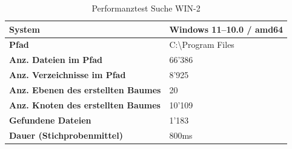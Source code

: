\documentclass[a4paper,12pt]{report}
\begin{document}
    \begin{table}[h!]
        \centering
        \setlength{\leftmargini}{0.8cm}
        \begin{tabular}{|p{7cm}|p{5cm}|}
            \hline
            \textbf{System}                                     & Windows 11--10.0 / amd64       \\ \hline
            \textbf{Pfad}                                       & C:\textbackslash Program Files \\ \hline
            \textbf{Anz. Dateien im Pfad}                       & 66'386                         \\ \hline
            \textbf{Anz. Verzeichnisse im Pfad}                 & 8'925                          \\ \hline
            \textbf{Anz. Ebenen \newline des erstellten Baumes} & 20                             \\ \hline
            \textbf{Anz. Knoten \newline des erstellten Baumes} & 10'109                         \\ \hline
            \textbf{Gefundene Dateien}                          & 1'183                          \\ \hline
            \textbf{Dauer (Stichprobenmittel)}                  & 800ms                          \\ \hline
        \end{tabular}
        \caption{Performanztest Suche WIN-2}\label{tab:perf-search-win-2}
    \end{table}
\end{document}
